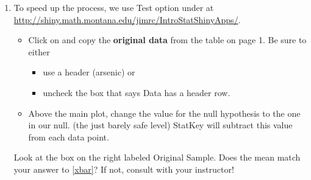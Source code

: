 \begin{enumerate}
\begin{enumerate}





\end{enumerate}
\item To speed up the process, we use  {\sf Test} option under
   at
  \url{http://shiny.math.montana.edu/jimrc/IntroStatShinyApps/}. 

  \begin{itemize}
    \item Click on  and copy the {\bf original data}
      from the table on page 1.  Be sure to either
      \begin{itemize}
      \item  use a header      (arsenic) or
      \item   uncheck the box that says Data has a header row.
      \end{itemize}
    \item Above the main plot, change the value for the null
      hypothesis to the one in our null.  (the just barely safe level)
      StatKey will subtract this value from each data point.
   \end{itemize}

    Look at the box on the right labeled {\sf Original Sample}.
       Does the mean match your answer to \ref{xbar}?  If not, consult
       with your instructor! 
\begin{students}
  \vspace{1cm}
\end{students}


\end{enumerate}
